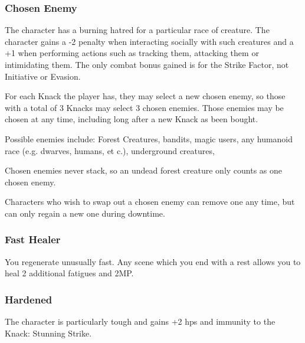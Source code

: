 \begin{multicols}{2}

\subsubsection{Chosen Enemy}

The character has a burning hatred for a particular race of creature.
The character gains a -2 penalty when interacting socially with such creatures and a +1 when performing actions such as tracking them, attacking them or intimidating them.
The only combat bonus gained is for the Strike Factor, not Initiative or Evasion.

For each Knack the player has, they may select a new chosen enemy, so those with a total of 3 Knacks may select 3 chosen enemies. Those enemies may be chosen at any time, including long after a new Knack as been bought.

Possible enemies include: Forest Creatures, bandits, magic users, any humanoid race (e.g. dwarves, humans, et c.), underground creatures, %
\iftoggle{aif}%
{undead, nura humanoids, and nura beasts.%
\footnote{See Adventures in Fenestra, \autoref{nura}.}}%
{and undead.}%

Chosen enemies never stack, so an undead forest creature only counts as one chosen enemy.

Characters who wish to swap out a chosen enemy can remove one any time, but can only regain a new one during downtime.

\subsubsection{Fast Healer}

You regenerate unusually fast. Any scene which you end with a rest allows you to heal 2 additional \glspl{fatigue} and 2MP.

\subsubsection{Hardened}

The character is particularly tough and gains +2 \glspl{hp} and immunity to the Knack: Stunning Strike.

\end{multicols}


